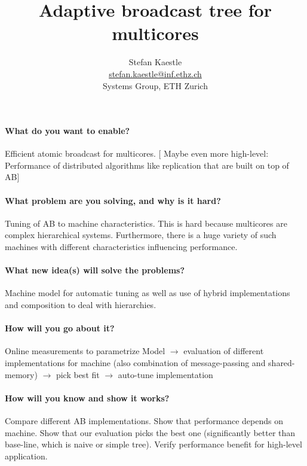 \documentclass{article}
\newcommand{\stefan}[1]{
  {\color{skRed}[{\color{red}{SK}} #1]}}
\begin{document}
\title{Adaptive broadcast tree for multicores}

\newcommand{\eaddr}{stefan.kaestle@inf.ethz.ch}
\newcommand{\email}{\href{mailto:\eaddr}{\eaddr}}

\author{Stefan Kaestle\\
  \email \\
  Systems Group, ETH Zurich}

\maketitle

\newcommand{\ska}{$\rightarrow$\xspace}

\paragraph{What do you want to enable?} 
Efficient atomic broadcast for multicores. \stefan{Maybe even more high-level:
  Performance of distributed algorithms like replication that are
  built on top of AB}

\paragraph{What problem are you solving, and why is it hard?} 
Tuning of AB to machine characteristics. This is hard because
multicores are complex hierarchical systems. Furthermore, there is a
huge variety of such machines with different characteristics
influencing performance.

\paragraph{What new idea(s) will solve the problems?}
Machine model for automatic tuning as well as use of hybrid
implementations and composition to deal with hierarchies.

\paragraph{How will you go about it?}
Online measurements to parametrize Model \ska evaluation of different
implementations for machine (also combination of message-passing and
shared-memory) \ska pick best fit \ska auto-tune implementation

\paragraph{How will you know and show it works?}
Compare different AB implementations. Show that performance depends on
machine. Show that our evaluation picks the best one (significantly
better than base-line, which is naive or simple tree). Verify
performance benefit for high-level application.
\end{document}

